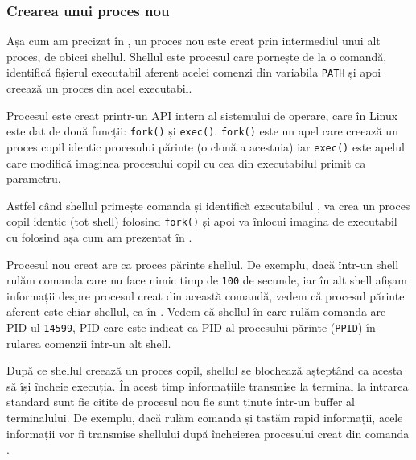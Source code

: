 \subsubsection{Crearea unui proces nou}
\label{sec:cli:shell:working:new-process}

Așa cum am precizat în , un proces nou este creat prin intermediul unui alt
proces, de obicei shellul. Shellul este procesul care pornește de la o
comandă, identifică fișierul executabil aferent acelei comenzi din variabila
\texttt{PATH} și apoi creează un proces din acel executabil.

Procesul este creat printr-un API intern al sistemului de operare, care în Linux
este dat de două funcții: \texttt{fork()} și \texttt{exec()}. \texttt{fork()} este un apel care creează un
proces copil identic procesului părinte (o clonă a acestuia) iar \texttt{exec()} este
apelul care modifică imaginea procesului copil cu cea din executabilul primit ca
parametru.

Astfel când shellul primește comanda  și identifică executabilul , va
crea un proces copil identic (tot shell) folosind \texttt{fork()} și apoi va înlocui
imagina de executabil cu  folosind  așa cum am prezentat în .

Procesul nou creat are ca proces părinte shellul. De exemplu, dacă într-un
shell rulăm comanda  care nu face nimic timp de \texttt{100} de secunde, iar în
alt shell afișam informații despre procesul creat din această comandă, vedem că
procesul părinte aferent este chiar shellul, ca în . Vedem că shellul în care rulăm comanda  are PID-ul \texttt{14599}, PID care este indicat ca PID al procesului părinte (\texttt{PPID}) în rularea comenzii  într-un alt shell.


După ce shellul creează un proces copil, shellul se blochează așteptând ca
acesta să își încheie execuția. În acest timp informațiile transmise la terminal
la intrarea standard sunt fie citite de procesul nou fie sunt ținute într-un
buffer al terminalului. De exemplu, dacă rulăm comanda  și tastăm rapid
informații, acele informații vor fi transmise shellului după încheierea
procesului creat din comanda .

